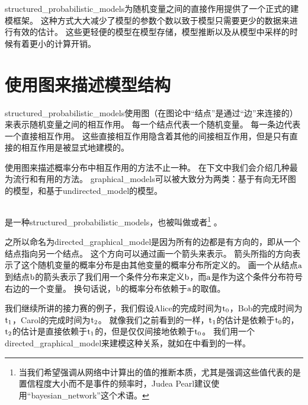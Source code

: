 \gls{structured_probabilistic_models}为随机变量之间的直接作用提供了一个正式的建模框架。
这种方式大大减少了模型的参数个数以致于模型只需要更少的数据来进行有效的估计。
这些更轻便的模型在模型存储，模型推断以及从模型中采样的时候有着更小的计算开销。


\section{使用图来描述模型结构}
\label{sec:using_graphs_to_describe_model_structure}


\gls{structured_probabilistic_models}使用图（在图论中``结点''是通过``边''来连接的）来表示随机变量之间的相互作用。
每一个结点代表一个随机变量。
每一条边代表一个直接相互作用。
这些直接相互作用隐含着其他的间接相互作用，但是只有直接的相互作用是被显式地建模的。


使用图来描述概率分布中相互作用的方法不止一种。
在下文中我们会介绍几种最为流行和有用的方法。
\gls{graphical_models}可以被大致分为两类：基于有向无环图的模型，和基于\gls{undirected_model}的模型。


\subsection{}
\label{sec:directed_models}


是一种\gls{structured_probabilistic_models}，也被叫做或者\footnote{当我们希望强调从网络中计算出的值的推断本质，尤其是强调这些值代表的是置信程度大小而不是事件的频率时，Judea Pearl建议使用``\gls{bayesian_network}''这个术语。} \citep{pearl85bayesian}。


之所以命名为\gls{directed_graphical_model}是因为所有的边都是有方向的，即从一个结点指向另一个结点。
这个方向可以通过画一个箭头来表示。
箭头所指的方向表示了这个随机变量的概率分布是由其他变量的概率分布所定义的。
画一个从结点$\mathrm{a}$到结点$\mathrm{b}$的箭头表示了我们用一个条件分布来定义$\mathrm{b}$，而$\mathrm{a}$是作为这个条件分布符号右边的一个变量。
换句话说，$\mathrm{b}$的概率分布依赖于$\mathrm{a}$的取值。


我们继续所讲的接力赛的例子，我们假设Alice的完成时间为$\mathrm{t}_0$，Bob的完成时间为$\mathrm{t}_1$，Carol的完成时间为$\mathrm{t}_2$。
就像我们之前看到的一样，$\mathrm{t}_1$的估计是依赖于$\mathrm{t}_0$的，$\mathrm{t}_2$的估计是直接依赖于$\mathrm{t}_1$的，但是仅仅间接地依赖于$\mathrm{t}_0$。
我们用一个\gls{directed_graphical_model}来建模这种关系，就如在中看到的一样。


